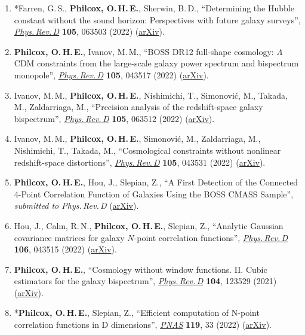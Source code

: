 \begin{enumerate}
    \item *Farren, G.\,S., \textbf{Philcox, O.\,H.\,E.}, Sherwin, B.\,D., ``Determining the Hubble constant without the sound horizon: Perspectives with future galaxy surveys'', \href{https://doi.org/10.1103/PhysRevD.105.063503}{\textit{Phys.\,Rev.\,D}} \textbf{105}, 063503 (2022) (\href{https://arxiv.org/abs/2112.10749}{arXiv}).
    \item \textbf{Philcox, O.\,H.\,E.}, Ivanov, M.\,M., ``BOSS DR12 full-shape cosmology: $\Lambda$CDM constraints from the large-scale galaxy power spectrum and bispectrum monopole'', \href{https://doi.org/10.1103/PhysRevD.105.043517}{\textit{Phys.\,Rev.\,D}} \textbf{105}, 043517 (2022) (\href{https://arxiv.org/abs/2112.04515}{arXiv}).
    \item Ivanov, M.\,M., \textbf{Philcox, O.\,H.\,E.}, Nishimichi, T., Simonovi\'c, M., Takada, M., Zaldarriaga, M., ``Precision analysis of the redshift-space galaxy bispectrum'', \href{https://doi.org/10.1103/PhysRevD.105.063512}{\textit{Phys.\,Rev.\,D}} \textbf{105}, 063512 (2022) (\href{https://arxiv.org/abs/2110.10161}{arXiv}).
    \item Ivanov, M.\,M., \textbf{Philcox, O.\,H.\,E.}, Simonovi\'c, M., Zaldarriaga, M., Nishimichi, T., Takada, M., ``Cosmological constraints without nonlinear redshift-space distortions'', \href{https://doi.org/10.1103/PhysRevD.105.043531}{\textit{Phys.\,Rev.\,D}} \textbf{105}, 043531 (2022) (\href{https://arxiv.org/abs/2110.00006}{arXiv}).
    \item \textbf{Philcox, O.\,H.\,E.}, Hou, J., Slepian, Z., ``A First Detection of the Connected 4-Point Correlation Function of Galaxies Using the BOSS CMASS Sample'', \textit{submitted to Phys.\,Rev.\,D} (\href{https://arxiv.org/abs/2108.01670}{arXiv}).
    \item Hou, J., Cahn, R.\,N., \textbf{Philcox, O.\,H.\,E.}, Slepian, Z., ``Analytic Gaussian covariance matrices for galaxy $N$-point correlation functions'', \href{https://doi.org/10.1103/PhysRevD.106.043515}{\textit{Phys.\,Rev.\,D}} \textbf{106}, 043515 (2022) (\href{https://arxiv.org/abs/2108.01714}{arXiv}).
    \item \textbf{Philcox, O.\,H.\,E.}, ``Cosmology without window functions. II. Cubic estimators for the galaxy bispectrum'', \href{https://doi.org/10.1103/PhysRevD.104.123529}{\textit{Phys.\,Rev.\,D}} \textbf{104}, 123529 (2021) (\href{https://arxiv.org/abs/2107.06287}{arXiv}).
    \item *\textbf{Philcox, O.\,H.\,E.}, Slepian, Z., ``Efficient computation of N-point correlation functions in D dimensions'', \href{https://doi.org/10.1073/pnas.2111366119}{\textit{PNAS}} \textbf{119}, 33 (2022) (\href{https://arxiv.org/abs/2106.10278}{arXiv}).

\end{enumerate}

